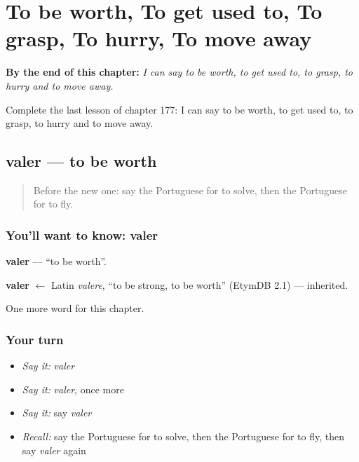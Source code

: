 
\chapter{To be worth, To get used to, To grasp, To hurry, To move away}
\label{ch:pt-to-be-worth-to-get-used-to-to-grasp-to-hurry-to-move-away}

\begin{chapteropening}
\textbf{By the end of this chapter:} \emph{I can say to be worth, to get used to, to grasp, to hurry and to move away.}

Complete the last lesson of chapter 177: I can say to be worth, to get used to, to grasp, to hurry and to move away.
\end{chapteropening}

\section[valer]{valer — to be worth}

\label{lesson:PT-C177-valer}



\begin{quote}
Before the new one: say the Portuguese for to solve, then the Portuguese for to fly.
\end{quote}

\subsection*{You'll want to know: valer}
\textbf{valer} — \textquotedblleft{}to be worth\textquotedblright{}.

\begin{cousinweb}
\textbf{valer} $\leftarrow$ Latin \emph{valere}, \textquotedblleft{}to be strong, to be worth\textquotedblright{} (EtymDB 2.1) — inherited.
\end{cousinweb}

\begin{grammarlens}[title={What you've built}]
One more word for this chapter.
\end{grammarlens}

\subsection*{Your turn}
\begin{itemize}
\raggedright
  \item \emph{Say it:} \emph{valer}
  \item \emph{Say it:} \emph{valer}, once more
  \item \emph{Say it:} say \emph{valer}
  \item \emph{Recall:} say the Portuguese for to solve, then the Portuguese for to fly, then say \emph{valer} again
\end{itemize}

